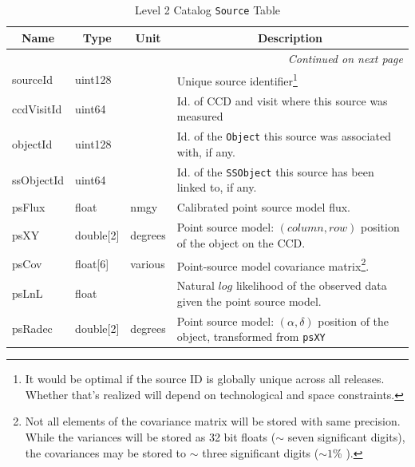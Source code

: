 \documentclass[12pt]{article}
\newcommand{\code}[1]{\texttt{#1}}
\newcommand{\Object}{\code{Object}\xspace}
\newcommand{\Source}{\code{Source}\xspace}
\newcommand{\SSObject}{\code{SSObject}\xspace}
\begin{document}
\begin{center}
\begin{longtable}{p{3cm}p{2cm}p{2cm}p{5cm}}
\caption[\Source Table]{Level 2 Catalog \Source Table
} \\

\hline \multicolumn{1}{c}{\bf Name} & \multicolumn{1}{c}{\bf Type} & \multicolumn{1}{c}{\bf Unit} & \multicolumn{1}{c}{\bf Description} \\ \hline
\endhead

\hline \multicolumn{4}{r}{{\em Continued on next page}} \\
\endfoot

\hline\hline
\endlastfoot

sourceId & uint128 & ~ & Unique source identifier\footnote{It would be optimal if the source ID is globally unique across all releases. Whether that's realized will depend on technological and space constraints.} \\ 

ccdVisitId & uint64 & ~ & Id. of CCD and visit where this source was measured \\ 

objectId & uint128 & ~ & Id. of the \Object this source was associated with, if any. \\ 

ssObjectId & uint64 & ~ & Id. of the \SSObject this source has been linked to, if any. \\ 

psFlux & float & nmgy & Calibrated point source model flux.\\ 

psXY & double[2] & degrees & Point source model: $(column, row)$ position of the object on the CCD. \\

psCov & float[6] & various & Point-source model covariance matrix\footnote{Not all elements of the covariance matrix will be stored with same precision. While the variances will be stored as 32 bit floats ($\sim$ seven significant digits), the covariances may be stored to $\sim$ three significant digits ($\sim 1$\% ).}. \\ 

psLnL & float & ~ & Natural $log$ likelihood of the observed data given the point source model. \\ 

psRadec & double[2] & degrees & Point source model: $(\alpha, \delta)$ position of the object, transformed from {\tt psXY} \\


\end{longtable}
\end{center}
\end{document}
